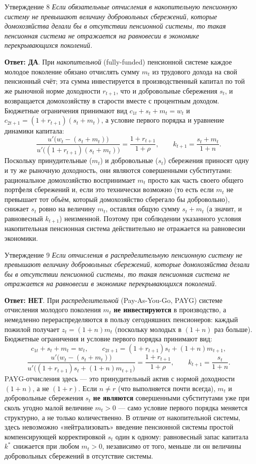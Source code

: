\documentclass[10pt,a4paper]{article}
\newcommand{\qda}{\textbf{\color{yesgreen}Ответ: ДА}}
\newcommand{\qnet}{\textbf{\color{nored}Ответ: НЕТ}}
\newenvironment{answer}[2]{%
  \begin{qbox}{Утверждение #1}
  \textit{#2}\par\smallskip
}{%
  \end{qbox}\vspace{2pt}
}
\begin{document}
\begin{answer}{8}{Если обязательные отчисления в накопительную пенсионную систему не превышают величину добровольных сбережений, которые домохозяйства делали бы в отсутствии пенсионной системы, то такая пенсионная система не отражается на равновесии в экономике перекрывающихся поколений.}
\qda. При \emph{накопительной} (fully-funded) пенсионной системе каждое молодое поколение обязано отчислять сумму $m_t$ из трудового дохода на свой пенсионный счёт; эта сумма инвестируется в производственный капитал по той же рыночной норме доходности $r_{t+1}$, что и добровольные сбережения $s_t$, и возвращается домохозяйству в старости вместе с процентным доходом. Бюджетные ограничения принимают вид $c_{1t}+s_t+m_t=w_t$ и $c_{2t+1}=(1+r_{t+1})(s_t+m_t)$, а условие первого порядка и уравнение динамики капитала:
\[
\frac{u'\bigl(w_t-(s_t+m_t)\bigr)}{u'\bigl((1+r_{t+1})(s_t+m_t)\bigr)} = \frac{1+r_{t+1}}{1+\rho},
\qquad
k_{t+1}=\frac{s_t+m_t}{1+n}.
\]
Поскольку принудительные ($m_t$) и добровольные ($s_t$) сбережения приносят одну и ту же рыночную доходность, они являются совершенными субститутами: рациональное домохозяйство воспринимает $m_t$ просто как часть своего общего портфеля сбережений и, если это технически возможно (то есть если $m_t$ не превышает тот объём, который домохозяйство сберегало бы добровольно), снижает $s_t$ ровно на величину $m_t$, оставляя общую сумму $s_t+m_t$ (а значит, и равновесный $k_{t+1}$) неизменной. Поэтому при соблюдении указанного условия накопительная пенсионная система действительно не отражается на равновесии экономики.
\end{answer}
 
\begin{answer}{9}{Если отчисления в распределительную пенсионную систему не превышают величину добровольных сбережений, которые домохозяйства делали бы в отсутствии пенсионной системы, то такая пенсионная система не отражается на равновесии в экономике перекрывающихся поколений.}
\qnet. При \emph{распределительной} (Pay-As-You-Go, PAYG) системе отчисления молодого поколения $m_t$ \textbf{не инвестируются} в производство, а немедленно перераспределяются в пользу сегодняшних пенсионеров: каждый пожилой получает $z_t=(1+n)m_t$ (поскольку молодых в $(1+n)$ раз больше). Бюджетные ограничения и условие первого порядка принимают вид:
\[
c_{1t}+s_t+m_t=w_t,\qquad c_{2t+1}=(1+r_{t+1})s_t+(1+n)m_{t+1},
\]
\[
\frac{u'\bigl(w_t-(s_t+m_t)\bigr)}{u'\bigl((1+r_{t+1})s_t+(1+n)m_{t+1}\bigr)} = \frac{1+r_{t+1}}{1+\rho}, \qquad k_{t+1}=\frac{s_t}{1+n}.
\]
PAYG-отчисления здесь — это принудительный актив с нормой доходности $(1+n)$, а не $(1+r)$. Если $n\neq r$ (что выполняется почти всегда), $m_t$ и добровольные сбережения $s_t$ \textbf{не являются} совершенными субститутами уже при сколь угодно малой величине $m_t>0$ — само условие первого порядка меняется структурно, а не только количественно. В отличие от накопительной системы, здесь невозможно «нейтрализовать» введение пенсионной системы простой компенсирующей корректировкой $s_t$ один к одному: равновесный запас капитала $k^{*}$ снижается при любом $m_t>0$, независимо от того, меньше ли он величины добровольных сбережений в отсутствие системы.
\end{answer}
 
\end{document}
